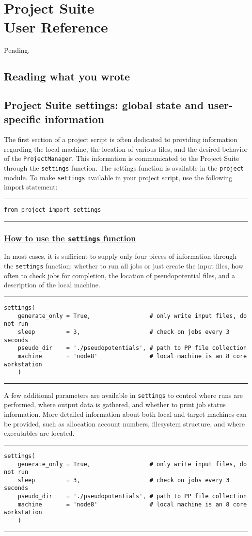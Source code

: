 \documentclass[oneside,11pt]{memoir}
\numberwithin{equation}{section}
\newcommand{\bu}[1]{\textbf{\underline{#1}}}
\newcommand{\HRule}{\rule{\linewidth}{0.5mm}}
\begin{document}
\pagebreak
\chapter{Project Suite \\User Reference} \label{reference}
Pending.

\section{Reading what you wrote}

\section{Project Suite settings: global state and user-specific information}
The first section of a project script is often dedicated to providing 
information regarding the local machine, the location of various files, and 
the desired behavior of the \texttt{ProjectManager}.  This information is 
communicated to the Project Suite through the \texttt{settings} function. 
The settings function is available in the \texttt{project} module.  To make 
\texttt{settings} available in your project script, use the following import 
statement:
\HRule
\begin{verbatim}
from project import settings
\end{verbatim}
\HRule

\subsection{\bu{How to use the \texttt{settings} function}}
In most cases, it is sufficient to supply only four pieces of information 
through the \texttt{settings} function: whether to run all jobs or just create 
the input files, how often to check jobs for completion, the location of 
pseudopotential files, and a description of the local machine.
\HRule
\begin{verbatim}
settings(
    generate_only = True,                 # only write input files, do not run
    sleep         = 3,                    # check on jobs every 3 seconds
    pseudo_dir    = './pseudopotentials', # path to PP file collection
    machine       = 'node8'               # local machine is an 8 core workstation
    )
\end{verbatim}
\HRule

A few additional parameters are available in \texttt{settings} to control where 
runs are performed, where output data is gathered, and whether to print job 
status information.  More detailed information about both local and target 
machines can be provided, such as allocation account numbers, filesystem 
structure, and where executables are located.
\HRule
\begin{verbatim}
settings(
    generate_only = True,                 # only write input files, do not run
    sleep         = 3,                    # check on jobs every 3 seconds
    pseudo_dir    = './pseudopotentials', # path to PP file collection
    machine       = 'node8'               # local machine is an 8 core workstation
    )
\end{verbatim}
\HRule
\end{document}
